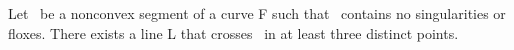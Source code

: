 %
\begin{lemma}
\label{threecross}
Let \pq\ be a nonconvex segment of a curve F such that
\pq\ contains no singularities or floxes.
There exists a line L that crosses
\pq\ in at least three distinct points.
\end{lemma}
%
